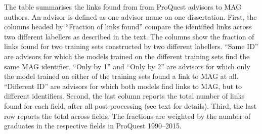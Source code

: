 \begin{table}
\begin{threeparttable}
\begin{tablenotes}[para]
\item The table summarises the links found from from ProQuest advisors to MAG authors. An advisor is defined as one advisor name on one dissertation. First, the columns headed by ``Fraction of links found'' compare the identified links across two different labellers as described in the text. The columns show the fraction of links found for two training sets constructed by two different labellers. ``Same ID'' are advisors for which the models trained on the different training sets find the same MAG identifier. ``Only by 1'' and ``Only by 2'' are advisors for which only the model trained on either of the training sets found a link to MAG at all. ``Different ID'' are advisors for which both models find links to MAG, but to different identifiers. Second, the last column reports the total number of links found for each field, after all post-processing (see text for details). Third, the last row reports the total across fields. The fractions are weighted by the number of graduates in the respective fields in ProQuest 1990--2015.
\end{tablenotes}
\end{threeparttable}
\end{table}
